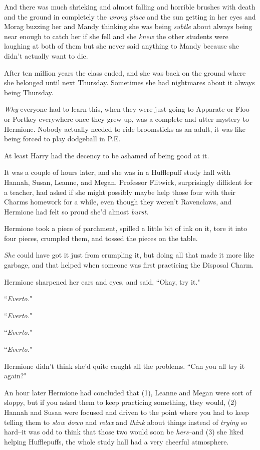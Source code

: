 And there was much shrieking and almost falling and horrible brushes with death and the ground in completely the \emph{wrong place} and the sun getting in her eyes and Morag buzzing her and Mandy thinking she was being \emph{subtle} about always being near enough to catch her if she fell and she \emph{knew} the other students were laughing at both of them but she never said anything to Mandy because she didn't actually want to die.

After ten million years the class ended, and she was back on the ground where she belonged until next Thursday. Sometimes she had nightmares about it always being Thursday.

\emph{Why} everyone had to learn this, when they were just going to Apparate or Floo or Portkey everywhere once they grew up, was a complete and utter mystery to Hermione. Nobody actually needed to ride broomsticks as an adult, it was like being forced to play dodgeball in P.E.

At least Harry had the decency to be ashamed of being good at it.

\later

It was a couple of hours later, and she was in a Hufflepuff study hall with Hannah, Susan, Leanne, and Megan. Professor Flitwick, surprisingly diffident for a teacher, had asked if she might possibly maybe help those four with their Charms homework for a while, even though they weren't Ravenclaws, and Hermione had felt so proud she'd almost \emph{burst}.

Hermione took a piece of parchment, spilled a little bit of ink on it, tore it into four pieces, crumpled them, and tossed the pieces on the table.

\emph{She} could have got it just from crumpling it, but doing all that made it more like garbage, and that helped when someone was first practicing the Disposal Charm.

Hermione sharpened her ears and eyes, and said, ``Okay, try it."

``\emph{Everto.}"

``\emph{Everto.}"

``\emph{Everto.}"

``\emph{Everto.}"

Hermione didn't think she'd quite caught all the problems. ``Can you all try it again?"

An hour later Hermione had concluded that (1), Leanne and Megan were sort of sloppy, but if you asked them to keep practicing something, they would, (2) Hannah and Susan were focused and driven to the point where you had to keep telling them to \emph{slow down} and \emph{relax} and \emph{think} about things instead of \emph{trying} so hard\---it was odd to think that those two would soon be \emph{hers}\---and (3) she liked helping Hufflepuffs, the whole study hall had a very cheerful atmosphere.

